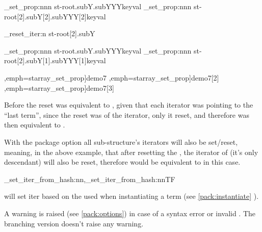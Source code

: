 \documentclass[10pt]{article}
\begin{document}
\begin{codestore}[demo7]
\starray_set_prop:nnn {st-root.subY.subYYY}{key}{val}
\starray_set_prop:nnn {st-root[2].subY[2].subYYY[2]}{key}{val}

\starray_reset_iter:n {st-root[2].subY}

\starray_set_prop:nnn {st-root.subY.subYYY}{key}{val}
\starray_set_prop:nnn {st-root[2].subY[1].subYYY[1]}{key}{val}
\end{codestore}

\tscode*[starray,emph=[3]{starray_reset_iter},emph={starray_set_prop}]{demo7}
\tscode*[starray,emph=[3]{starray_reset_iter},emph={starray_set_prop}]{demo7}[2]
\tscode*[starray,emph=[3]{starray_reset_iter},emph={starray_set_prop}]{demo7}[3]

Before the reset  was equivalent to , given that each iterator was pointing to the ``last term'', since the reset was of the  iterator, only it  reset, and therefore  was then equivalent to .
\begin{tsremark}
  With the package option  all sub-structure's iterators will also be set/reset, meaning, in the above example, that after resetting the , the iterator of  (it's only descendant) will also be reset, therefore  would be equivalent to  in this case.
\end{tsremark}



\begin{codedescribe}[code,new=2023/11/04]{\starray_set_iter_from_hash:nn,\starray_set_iter_from_hash:nnTF}
\begin{codesyntax}%
\end{codesyntax}
 will set iter based on the  used when instantiating a term (see \ref{pack:instantiate} ).
\end{codedescribe}
\begin{tsremark}
A warning is raised (see \ref{pack:options}) in case of a  syntax error or invalid . The branching version doesn't raise any warning.
\end{tsremark}
\end{document}
